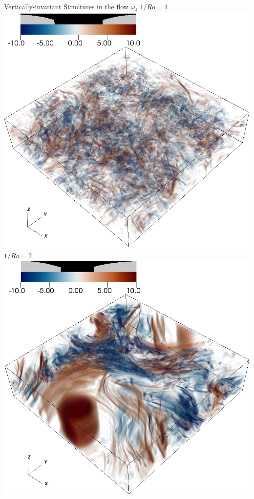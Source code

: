 \documentclass[aspecttatio=169]{beamer}
\begin{document}
\begin{frame}{Vertically-invariant Structures in the flow}
    \centering
        $\omega_z$
    \emp
        \centering
        $1/Ro = 1$
        \includegraphics[width=.95\textwidth]{images/vortz_Om0.5_vr2.png}
    \emp
        \centering
        $1/Ro = 2$
        \includegraphics[width=.95\textwidth]{images/vortz_Om2_vr2.png}

\end{frame}
\end{document}

